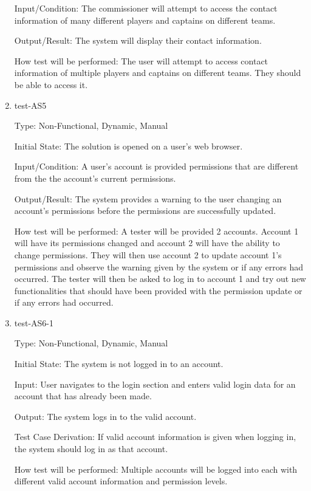 \documentclass[12pt, titlepage]{article}
\begin{document}
\begin{enumerate}
  Input/Condition: The commissioner will attempt to access the contact
  information of many different players and captains on different teams.

  Output/Result: The system will display their contact information.

  How test will be performed: The user will attempt to access contact
  information of multiple players and captains on different teams. They should
  be able to access it.

  \item{test-AS5\\}

  Type: Non-Functional, Dynamic, Manual

  Initial State: The solution is opened on a user's web browser.

  Input/Condition: A user's account is provided permissions that are different from the
  the account's current permissions.

  Output/Result: The system provides a warning to the user changing an account's
  permissions before the permissions are successfully updated.

  How test will be performed: A tester will be provided 2 accounts. Account 1 will have its
  permissions changed and account 2 will have the ability to change permissions. They will then
  use account 2 to update account 1's permissions and observe the warning given by the system
  or if any errors had occurred. The tester will then be asked to log in to account 1 and try
  out new functionalities that should have been provided with the permission update or if any
  errors had occurred.

  \item{test-AS6-1\\}
  
  Type: Non-Functional, Dynamic, Manual

  Initial State: The system is not logged in to an account.

  Input: User navigates to the login section and enters valid login data for
  an account that has already been made.

  Output: The system logs in to the valid account.

  Test Case Derivation: If valid account information is given when logging in,
  the system should log in as that account.

  How test will be performed: Multiple accounts will be logged into each with
  different valid account information and permission levels.


\end{enumerate}
\end{document}
